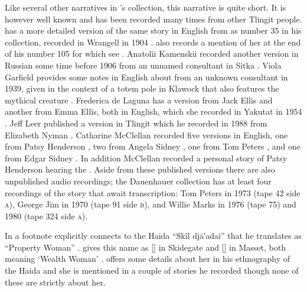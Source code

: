 Like several other narratives in \citeauthor{swanton:1909}’s collection, this narrative is quite short.
It is however well known and has been recorded many times from other Tlingit people.
\citeauthor{swanton:1909} has a more detailed version of the same story in English from  as number 35 in his collection, recorded in Wrangell in 1904 \parencite[173–175]{swanton:1909}.
\citeauthor{swanton:1909} also records a mention of her at the end of his number 105 for which see . 
Anatolii Kamenskii recorded another version in Russian some time before 1906 from an unnamed consultant in Sitka \parencites{kamenskii:1906}[68–70]{kamenskii-kan:1985}.
Viola Garfield provides some notes in English about  from an unknown consultant in 1939, given in the context of a totem pole in Klawock that also features the  mythical creature \parencite[117–118]{garfield-forrest:1948}.
Frederica de Laguna has a version from  Jack Ellis and another from  Emma Ellis, both in English, which she recorded in Yakutat in 1954 \parencite[884]{de-laguna:1972}.
Jeff Leer published a version in Tlingit which he recorded in 1988 from  Elizabeth Nyman \parencite[218–255]{nyman:1993}.
Catharine McClellan recorded five versions in English, one from  Patsy Henderson \parencite[238–241]{mcclellan-cruikshank:2007b}, two from  Angela Sidney \parencite[344–348, 348–353]{mcclellan-cruikshank:2007b}, one from  Tom Peters \parencite[715–719]{mcclellan-cruikshank:2007c}, and one from  Edgar Sidney \parencite[747–753]{mcclellan-cruikshank:2007c}.
In addition McClellan recorded a personal story of  Patsy Henderson hearing the  \parencite[241–244]{mcclellan-cruikshank:2007b}.
Aside from these published versions there are also unpublished audio recordings;
the Dauenhauer collection has at least four recordings of the story that await transcription:  Tom Peters in 1973 (tape 42 side \textsc{a}),  George Jim in 1970 (tape 91 side \textsc{b}), and  Willie Marks in 1976 (tape 75) and 1980 (tape 324 side \textsc{a}).

In a footnote \citeauthor{swanton:1909} explicitly connects  to the Haida “Skîl djā′adai” that he translates as “Property Woman” \parencite[292 fn.\ a]{swanton:1909}.
\citeauthor{enrico:2005} gives this name as  [] in Skidegate and  [] in Masset, both meaning ‘Wealth Woman’ \parencite[525]{enrico:2005}.
\citeauthor{swanton:1905a} offers some details about her in his ethnography of the Haida \parencite[29]{swanton:1905a} and she is mentioned in a couple of stories he recorded \parencites{swanton:1905b}{swanton:1908a} though none of these are strictly about her.

